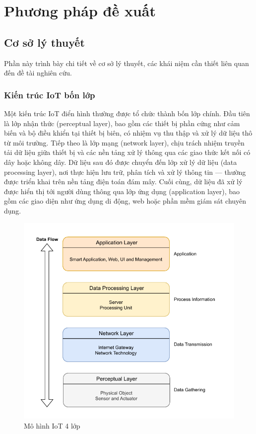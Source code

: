 \chapter{Phương pháp đề xuất}
\label{Chapter3}

\section{Cơ sở lý thuyết}
Phần này trình bày chi tiết về cơ sở lý thuyết, các khái niệm cần thiết liên quan đến đề tài nghiên cứu.
\subsection{Kiến trúc IoT bốn lớp}
\label{sec:4layer}
Một kiến trúc IoT điển hình thường được tổ chức thành bốn lớp chính. Đầu tiên là lớp nhận thức (perceptual layer), bao gồm các thiết bị phần cứng như cảm biến và bộ điều khiển tại thiết bị biên, có nhiệm vụ thu thập và xử lý dữ liệu thô từ môi trường. Tiếp theo là lớp mạng (network layer), chịu trách nhiệm truyền tải dữ liệu giữa thiết bị và các nền tảng xử lý thông qua các giao thức kết nối có dây hoặc không dây. Dữ liệu sau đó được chuyển đến lớp xử lý dữ liệu (data processing layer), nơi thực hiện lưu trữ, phân tích và xử lý thông tin — thường được triển khai trên nền tảng điện toán đám mây. Cuối cùng, dữ liệu đã xử lý được hiển thị tới người dùng thông qua lớp ứng dụng (application layer), bao gồm các giao diện như ứng dụng di động, web hoặc phần mềm giám sát chuyên dụng.
\begin{figure}[h]
    \centering
    \includegraphics[width=0.75\linewidth]{images/4layer.pdf}
    \caption{Mô hình IoT 4 lớp}
    \label{fig:4layer}
\end{figure}
